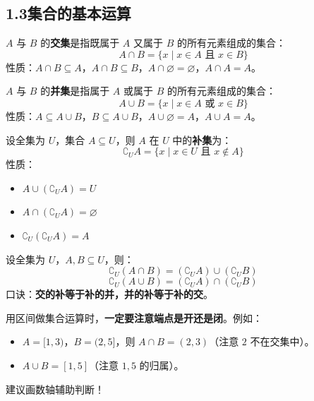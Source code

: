 \documentclass[12pt, a4paper]{ctexart}
\begin{document}
\subsection*{1.3\quad 集合的基本运算}

\begin{knowledgebox}[交集]
$A$ 与 $B$ 的\textbf{交集}是指既属于 $A$ 又属于 $B$ 的所有元素组成的集合：
\[
  A \cap B = \{x \mid x \in A \text{ 且 } x \in B\}
\]
性质：$A \cap B \subseteq A$，$A \cap B \subseteq B$，$A \cap \varnothing = \varnothing$，$A \cap A = A$。
\end{knowledgebox}

\begin{knowledgebox}[并集]
$A$ 与 $B$ 的\textbf{并集}是指属于 $A$ 或属于 $B$ 的所有元素组成的集合：
\[
  A \cup B = \{x \mid x \in A \text{ 或 } x \in B\}
\]
性质：$A \subseteq A \cup B$，$B \subseteq A \cup B$，$A \cup \varnothing = A$，$A \cup A = A$。
\end{knowledgebox}

\begin{knowledgebox}[补集]
设全集为 $U$，集合 $A \subseteq U$，则 $A$ 在 $U$ 中的\textbf{补集}为：
\[
  \complement_U A = \{x \mid x \in U \text{ 且 } x \notin A\}
\]
性质：
\begin{itemize}[leftmargin=2em]
  \item $A \cup (\complement_U A) = U$
  \item $A \cap (\complement_U A) = \varnothing$
  \item $\complement_U (\complement_U A) = A$
\end{itemize}
\end{knowledgebox}

\begin{tipbox}[德摩根律]
设全集为 $U$，$A, B \subseteq U$，则：
\[
  \complement_U (A \cap B) = (\complement_U A) \cup (\complement_U B)
\]
\[
  \complement_U (A \cup B) = (\complement_U A) \cap (\complement_U B)
\]
口诀：\textbf{交的补等于补的并，并的补等于补的交}。
\end{tipbox}

\begin{warnbox}
用区间做集合运算时，\textbf{一定要注意端点是开还是闭}。例如：
\begin{itemize}[leftmargin=2em]
  \item $A = [1, 3)$，$B = (2, 5]$，则 $A \cap B = (2, 3)$（注意 $2$ 不在交集中）。
  \item $A \cup B = [1, 5]$（注意 $1, 5$ 的归属）。
\end{itemize}
建议画数轴辅助判断！
\end{warnbox}
\end{document}
